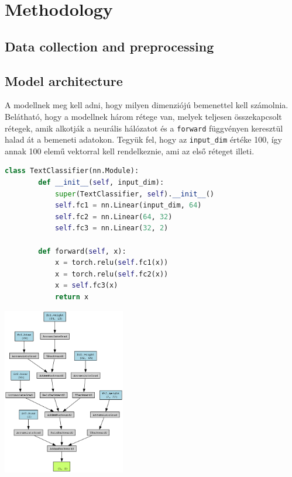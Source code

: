 ﻿\section{Methodology}

\lstset{
  basicstyle=\small\ttfamily,
  captionpos=b,
  frame=single,
  breaklines=true,
  showstringspaces=false,
  aboveskip=2.5pt,
  belowskip=2pt
}

\subsection{Data collection and preprocessing}


\subsection{Model architecture}
A modellnek meg kell adni, hogy milyen dimenziójú bemenettel kell számolnia. Belátható, hogy a modellnek három rétege van, melyek teljesen összekapcsolt rétegek, amik alkotják a neurális hálózatot és a \verb|forward| függvényen keresztül halad át a bemeneti adatokon. Tegyük fel, hogy az \verb|input_dim| értéke 100, így annak 100 elemű vektorral kell rendelkeznie, ami az első réteget illeti.
\begin{lstlisting}[language=Python, caption={Modell Python kód tartalma}, label=modell]
    class TextClassifier(nn.Module):
        def __init__(self, input_dim):
            super(TextClassifier, self).__init__()
            self.fc1 = nn.Linear(input_dim, 64)
            self.fc2 = nn.Linear(64, 32)
            self.fc3 = nn.Linear(32, 2)

        def forward(self, x):
            x = torch.relu(self.fc1(x))
            x = torch.relu(self.fc2(x))
            x = self.fc3(x)
            return x
\end{lstlisting}
\includegraphics[width=0.4\textwidth]{text_classifier_model.png} \\